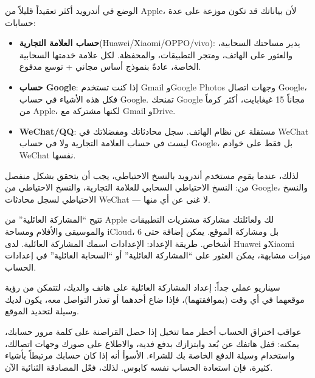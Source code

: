
الوضع في أندرويد أكثر تعقيداً قليلاً من Apple، لأن بياناتك قد تكون موزعة على عدة حسابات:

\begin{itemize}
  \item \textbf{حساب العلامة التجارية}(Huawei/Xiaomi/OPPO/vivo): يدير مساحتك السحابية، والعثور على الهاتف، ومتجر التطبيقات، والمحفظة. لكل علامة خدمتها السحابية الخاصة، عادةً بنموذج أساس مجاني + توسع مدفوع.
  \item \textbf{حساب Google}: إذا كنت تستخدم Gmail وGoogle Photos وجهات اتصال Google، فكل هذه الأشياء في حساب Google. تمنحك Google مجاناً 15 غيغابايت، أكثر كرماً من Apple، لكنها مشتركة مع Gmail وDrive.
  \item \textbf{WeChat/QQ}: مستقلة عن نظام الهاتف. سجل محادثاتك ومفضلاتك في WeChat ليست في حساب العلامة التجارية ولا في حساب Google، بل فقط على خوادم WeChat نفسها.
\end{itemize}

لذلك، عندما يقوم مستخدم أندرويد بالنسخ الاحتياطي، يجب أن يتحقق بشكل منفصل من: النسخ الاحتياطي السحابي للعلامة التجارية، والنسخ الاحتياطي من Google، والنسخ الاحتياطي لسجل محادثات WeChat — لا غنى عن أي منها.


تتيح “المشاركة العائلية” من Apple لك ولعائلتك مشاركة مشتريات التطبيقات والموسيقى والأفلام ومساحة iCloud، بل ومشاركة الموقع. يمكن إضافة حتى 6 أشخاص. طريقة الإعداد: الإعدادات اسمك المشاركة العائلية. لدى Huawei وXiaomi ميزات مشابهة، يمكن العثور على “المشاركة العائلية” أو “السحابة العائلية” في إعدادات الحساب.

سيناريو عملي جداً: إعداد المشاركة العائلية على هاتف والديك، لتتمكن من رؤية موقعهما في أي وقت (بموافقتهما)، فإذا ضاع أحدهما أو تعذر التواصل معه، يكون لديك وسيلة لتحديد الموقع.

\begin{tcbwarn}{عواقب اختراق الحساب أخطر مما تتخيل}
إذا حصل القراصنة على كلمة مرور حسابك، يمكنه: قفل هاتفك عن بُعد وابتزازك بدفع فدية، والاطلاع على صورك وجهات اتصالك، واستخدام وسيلة الدفع الخاصة بك للشراء. الأسوأ أنه إذا كان حسابك مرتبطاً بأشياء كثيرة، فإن استعادة الحساب نفسه كابوس. لذلك، فعّل المصادقة الثنائية الآن.

\end{tcbwarn}

